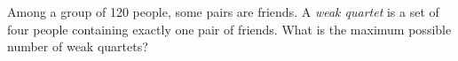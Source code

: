 Among a group of 120 people, some pairs are friends. A \emph{weak quartet} is a set of four people containing exactly one pair of friends. What is the maximum possible number of weak quartets?
